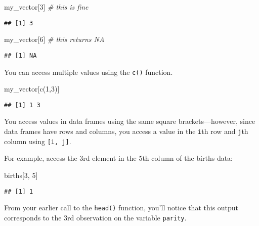 \documentclass[
]{article}
\newenvironment{Shaded}{\begin{snugshade}}{\end{snugshade}}
\newcommand{\CommentTok}[1]{\textcolor[rgb]{0.56,0.35,0.01}{\textit{#1}}}
\newcommand{\DecValTok}[1]{\textcolor[rgb]{0.00,0.00,0.81}{#1}}
\newcommand{\FunctionTok}[1]{\textcolor[rgb]{0.00,0.00,0.00}{#1}}
\newcommand{\NormalTok}[1]{#1}
\begin{document}
\begin{Shaded}
\begin{Highlighting}[]
\NormalTok{my\_vector[}\DecValTok{3}\NormalTok{] }\CommentTok{\# this is fine}
\end{Highlighting}
\end{Shaded}

\begin{verbatim}
## [1] 3
\end{verbatim}

\begin{Shaded}
\begin{Highlighting}[]
\NormalTok{my\_vector[}\DecValTok{6}\NormalTok{] }\CommentTok{\# this returns NA}
\end{Highlighting}
\end{Shaded}

\begin{verbatim}
## [1] NA
\end{verbatim}

You can access multiple values using the \texttt{c()} function.

\begin{Shaded}
\begin{Highlighting}[]
\NormalTok{my\_vector[}\FunctionTok{c}\NormalTok{(}\DecValTok{1}\NormalTok{,}\DecValTok{3}\NormalTok{)]}
\end{Highlighting}
\end{Shaded}

\begin{verbatim}
## [1] 1 3
\end{verbatim}

You access values in data frames using the same square
brackets---however, since data frames have rows and columns, you access
a value in the \texttt{i}th row and \texttt{j}th column using
\texttt{{[}i,\ j{]}}.

For example, access the 3rd element in the 5th column of the births
data:

\begin{Shaded}
\begin{Highlighting}[]
\NormalTok{births[}\DecValTok{3}\NormalTok{, }\DecValTok{5}\NormalTok{]}
\end{Highlighting}
\end{Shaded}

\begin{verbatim}
## [1] 1
\end{verbatim}

From your earlier call to the \texttt{head()} function, you'll notice
that this output corresponds to the 3rd observation on the variable
\texttt{parity}.
\end{document}

